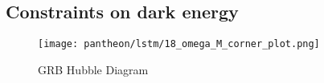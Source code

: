 \subsection{Constraints on dark energy}
\begin{figure}[H]
	\centering
	\texttt{[image: pantheon/lstm/18\_omega\_M\_corner\_plot.png]}
	\caption{GRB Hubble Diagram}
	\label{fig:OmegaM_lstm}
\end{figure}